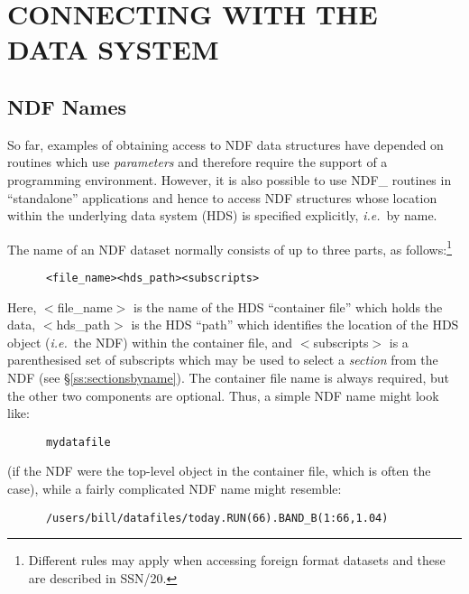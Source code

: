 \documentclass[twoside,11pt]{article}
\newcommand{\xref}[3]{#1}
\newcommand{\xlabel}[1]{}
\newcommand{\st}[1]{{\em{#1}}}
\begin{document}
\section{\xlabel{connecting_with_the_data_system}\label{ss:connecting}CONNECTING WITH THE DATA SYSTEM}

\subsection{\xlabel{ndf_names}\label{ss:ndfnames}NDF Names}

So far, examples of obtaining access to NDF data structures have
depended on routines which use \st{parameters} and therefore require
the support of a programming environment.
However, it is also possible to use NDF\_ routines in ``standalone''
applications and hence to access NDF structures whose location within
the underlying data system (\xref{HDS}{sun92}{}) is specified
explicitly, \st{i.e.}\ by name.

The name of an NDF dataset normally consists of up to three parts, as
follows:\footnote{Different rules may apply when accessing foreign
format datasets and these are described in \xref{SSN/20}{ssn20}{}.}

\small
\begin{verbatim}
      <file_name><hds_path><subscripts>
\end{verbatim}
\normalsize

Here, $<$file\_name$>$ is the name of the HDS ``\xref{container
file}{sun92}{introduction}'' which holds the data, $<$hds\_path$>$ is
the HDS ``path'' which identifies the location of the HDS object
(\st{i.e.}\ the NDF) within the container file, and $<$subscripts$>$
is a 
parenthesised set of subscripts which may be used to select a \st{section} from the NDF (see \S\ref{ss:sectionsbyname}). The container
file name is always required, but the other two components are
optional. Thus, a simple NDF name might look like:

\small
\begin{verbatim}
      mydatafile
\end{verbatim}
\normalsize

(if the NDF were the top-level object in the container file, which is
often the case), while a fairly complicated NDF name might resemble:

\small
\begin{verbatim}
      /users/bill/datafiles/today.RUN(66).BAND_B(1:66,1.04)
\end{verbatim}
\normalsize
\end{document}
